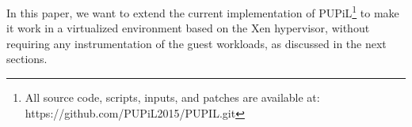 In this paper, we want to extend the current implementation of PUPiL\footnote{All source code, scripts, inputs, and patches are available at: https://github.com/PUPiL2015/PUPIL.git} to make it work in a virtualized environment based on the Xen hypervisor, without requiring any instrumentation of the guest workloads, as discussed in the next sections.




